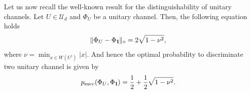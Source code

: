 \documentclass[preprint,12pt, a4paper]{elsarticle}
\newcommand{\1}{{\rm 1\hspace{-0.9mm}l}}
\newcommand{\Id}{{\rm 1\hspace{-0.9mm}l}}
\newcommand{\UU}{\mathcal{U}}
\newcommand{\HH}{\mathcal{H}}
\newcommand{\tr}{\mathrm{tr}}
\begin{document}
 Let us now recall the well-known result for the
distinguishability of unitary channels.
	Let $U \in \UU_d$ and $\Phi_U$ be a unitary 
	channel. 
	Then, the following equation holds
	\begin{equation}
	\| \Phi_U  - \Phi_{\1} \|_\diamond = 2 \sqrt{1-\nu^2},
	\end{equation}
	where $\nu = \min_{x \in W(U^\dagger)} |x|  $. And hence the optimal probability to discriminate two unitary channel is given by 
	\begin{equation}
	p_{\text{succ}}(\Phi_U, \Phi_\Id) = \frac{1}{2} + \frac{1}{2} \sqrt{1-\nu^2}.
	\end{equation}





%
\end{document}
